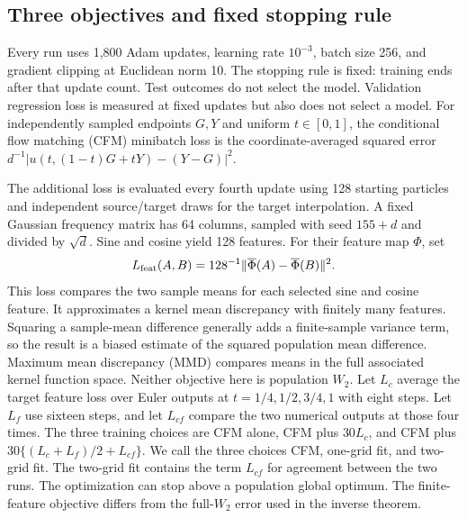 \subsection{Three objectives and fixed stopping rule}
Every run uses 1,800 Adam updates, learning rate $10^{-3}$, batch size 256,
and gradient clipping at Euclidean norm 10. The stopping rule is fixed:
training ends after that update count. Test outcomes do not select the
model. Validation regression loss is measured at fixed updates but also
does not select a model.
For independently sampled endpoints $G,Y$ and uniform $t\in[0,1]$, the
conditional flow matching (CFM) minibatch loss is the coordinate-averaged
squared error
$d^{-1}|u(t,(1-t)G+tY)-(Y-G)|^2$.

The additional loss is evaluated every fourth update using 128 starting
particles and independent source/target draws for the target interpolation.
A fixed Gaussian frequency matrix has 64 columns, sampled with seed $155+d$
and divided by $\sqrt d$. Sine and cosine yield 128 features. For their
feature map $\Phi$, set
\[
 L_{\rm feat}(A,B)=128^{-1}\|\overline\Phi(A)-\overline\Phi(B)\|^2.
\]
This loss compares the two sample means for each selected sine and cosine
feature. It approximates a kernel mean discrepancy with finitely many
features. Squaring a sample-mean difference generally adds a finite-sample
variance term, so the result is a biased estimate of the squared population
mean difference. Maximum mean discrepancy (MMD) compares means in the full
associated kernel function space. Neither objective here is population
$W_2$.
Let $L_c$ average the target feature loss over Euler outputs at
$t=1/4,1/2,3/4,1$ with eight steps. Let $L_f$ use sixteen steps, and let
$L_{cf}$ compare the two numerical outputs at those four times. The three
training choices are CFM alone, CFM plus $30L_c$, and CFM plus
$30\{(L_c+L_f)/2+L_{cf}\}$. We call the three choices CFM, one-grid fit, and two-grid fit. The
two-grid fit contains the term $L_{cf}$ for agreement between the two
runs.
The optimization can stop above a population global optimum. The
finite-feature objective differs from the full-$W_2$ error used in the
inverse theorem.

